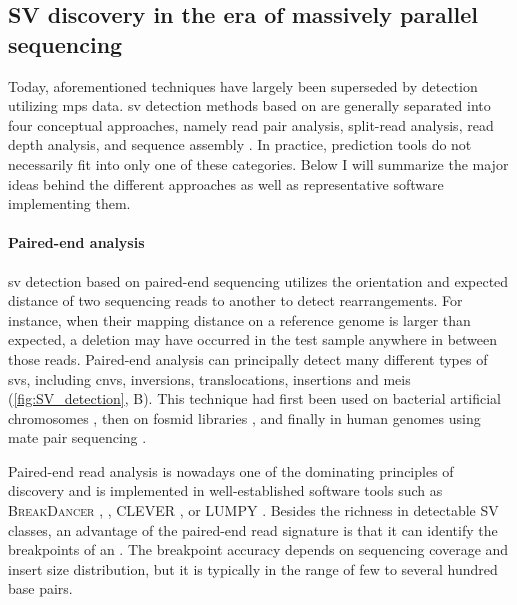 \subsection{SV discovery in the era of massively parallel sequencing}
\label{sec:sv_detection_ngs}

Today, aforementioned techniques have largely been superseded by \sv detection
utilizing \acl{mps} data.
\Ac{sv} detection methods based on \mps are generally
separated into four conceptual approaches, namely read pair analysis,
split-read analysis, read depth analysis, and sequence assembly \citep{Alkan2011}. In practice,
\sv prediction tools do not necessarily fit into only one of these categories.
Below I will summarize the major ideas behind the different approaches as well
as representative software implementing them.

\paragraph{Paired-end analysis}
\Ac{sv} detection based on paired-end sequencing utilizes the orientation and
expected distance of two sequencing reads to another to detect rearrangements.
For instance, when their mapping distance on a reference genome is larger than
expected, a deletion may have occurred in the test sample anywhere in between
those reads. Paired-end analysis can principally detect many different types of
\acp{sv}, including \acp{cnv}, inversions, translocations, insertions and
\acp{mei} (\cref{fig:SV_detection}, B). This technique had first been used on
bacterial artificial chromosomes
\citep{Volik2003}, then on fosmid libraries \citep{Tuzun2005}, and finally
in human genomes using mate pair
sequencing \citep{Korbel2007}.

Paired-end read analysis is nowadays one of the dominating principles of
\sv discovery and is implemented in well-established
software tools such as \textsc{BreakDancer} \citep{Chen2009}, \delly,
\textsc{CLEVER} \citep{Marschall2012}, or \textsc{LUMPY} \citep{Layer2014}.
Besides the richness in detectable SV classes, an advantage of the paired-end
read signature is that it can identify the breakpoints of an \sv. The breakpoint
accuracy depends on sequencing coverage and insert size distribution, but
it is typically in the range of few to several hundred base pairs.

